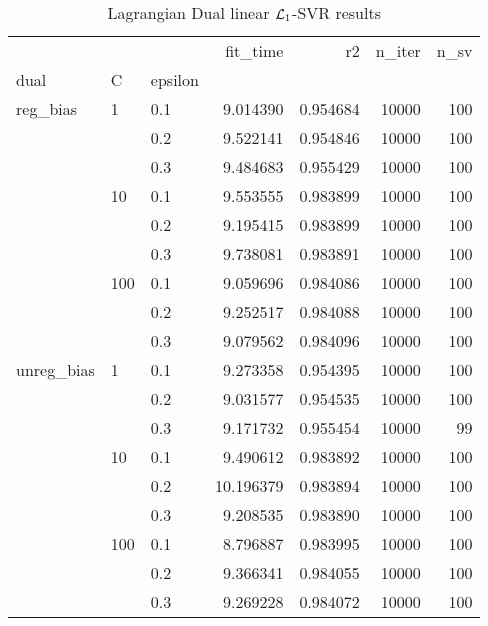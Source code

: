 \begin{table}[H]
\centering
\caption{Lagrangian Dual linear $\protect \mathcal{L}_1$-SVR results}
\label{linear_lagrangian_dual_l1_svr_cv_results}
\begin{tabular}{lllrrrr}
\toprule
           &     &     &   fit\_time &        r2 &  n\_iter &  n\_sv \\
dual & C & epsilon &            &           &         &       \\
\midrule
reg\_bias & 1   & 0.1 &   9.014390 &  0.954684 &   10000 &   100 \\
           &     & 0.2 &   9.522141 &  0.954846 &   10000 &   100 \\
           &     & 0.3 &   9.484683 &  0.955429 &   10000 &   100 \\
           & 10  & 0.1 &   9.553555 &  0.983899 &   10000 &   100 \\
           &     & 0.2 &   9.195415 &  0.983899 &   10000 &   100 \\
           &     & 0.3 &   9.738081 &  0.983891 &   10000 &   100 \\
           & 100 & 0.1 &   9.059696 &  0.984086 &   10000 &   100 \\
           &     & 0.2 &   9.252517 &  0.984088 &   10000 &   100 \\
           &     & 0.3 &   9.079562 &  0.984096 &   10000 &   100 \\
unreg\_bias & 1   & 0.1 &   9.273358 &  0.954395 &   10000 &   100 \\
           &     & 0.2 &   9.031577 &  0.954535 &   10000 &   100 \\
           &     & 0.3 &   9.171732 &  0.955454 &   10000 &    99 \\
           & 10  & 0.1 &   9.490612 &  0.983892 &   10000 &   100 \\
           &     & 0.2 &  10.196379 &  0.983894 &   10000 &   100 \\
           &     & 0.3 &   9.208535 &  0.983890 &   10000 &   100 \\
           & 100 & 0.1 &   8.796887 &  0.983995 &   10000 &   100 \\
           &     & 0.2 &   9.366341 &  0.984055 &   10000 &   100 \\
           &     & 0.3 &   9.269228 &  0.984072 &   10000 &   100 \\
\bottomrule
\end{tabular}
\end{table}
